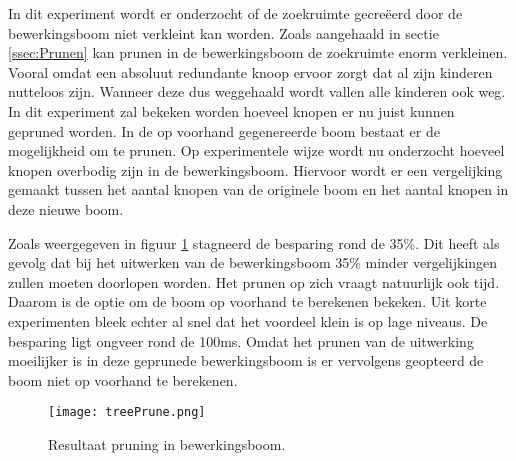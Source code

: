 \documentclass[Main.tex]{subfiles}
\begin{document}
In dit experiment wordt er onderzocht of de zoekruimte gecre\"eerd door de bewerkingsboom niet verkleint kan worden. Zoals aangehaald in sectie \ref{ssec:Prunen} kan prunen in de bewerkingsboom de zoekruimte enorm verkleinen. Vooral omdat een absoluut redundante knoop ervoor zorgt dat al zijn kinderen nutteloos zijn. Wanneer deze dus weggehaald wordt vallen alle kinderen ook weg. In dit experiment zal bekeken worden hoeveel knopen er nu juist kunnen gepruned worden.
In de op voorhand gegenereerde boom bestaat er de mogelijkheid om te prunen. Op experimentele wijze wordt nu onderzocht hoeveel knopen overbodig zijn in de bewerkingsboom. Hiervoor wordt er een vergelijking gemaakt tussen het aantal knopen van de originele boom en het aantal knopen in deze nieuwe boom.
\par Zoals weergegeven in figuur \ref{fig:pruningInBewerkingsboom} stagneerd de besparing rond de 35\%. Dit heeft als gevolg dat bij het uitwerken van de bewerkingsboom 35\% minder vergelijkingen zullen moeten doorlopen worden. Het prunen op zich vraagt natuurlijk ook tijd. Daarom is de optie om de boom op voorhand te berekenen bekeken. Uit korte experimenten bleek echter al snel dat het voordeel klein is op lage niveaus. De besparing ligt ongveer rond de 100ms. Omdat het prunen van de uitwerking \\moeilijker is in deze geprunede bewerkingsboom is er vervolgens geopteerd de boom niet op voorhand te berekenen.
\begin{figure}
\centering
\texttt{[image: treePrune.png]} 
\caption{Resultaat pruning in bewerkingsboom.} \label{fig:pruningInBewerkingsboom}
\end{figure}
\end{document}
